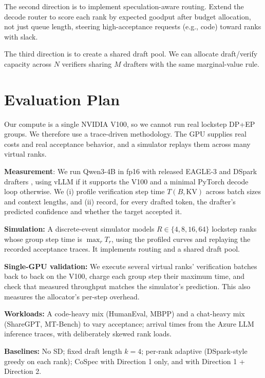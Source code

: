 \documentclass{article}
\begin{document}
The second direction is to implement speculation-aware routing. Extend the decode router to score each
rank by expected goodput after budget allocation, not just queue length,
steering high-acceptance requests (e.g., code) toward ranks with slack.

The third direction is to create a shared draft pool. We can allocate draft/verify capacity
across $N$ verifiers sharing $M$ drafters with the same marginal-value rule.

\section{Evaluation Plan}
\label{sec:eval}

Our compute is a single NVIDIA V100, so we cannot run real lockstep DP+EP
groups. We therefore use a trace-driven methodology. The GPU supplies
real costs and real acceptance behavior, and a simulator replays them across
many virtual ranks.

\textbf{Measurement}: We run Qwen3-4B in fp16 with released
EAGLE-3 and DSpark drafters \cite{cheng2026dspark}, using vLLM if it supports
the V100 and a minimal PyTorch decode loop otherwise. We (i) profile verification
step time $T(B,\mathrm{KV})$ across batch sizes and context lengths, and
(ii) record, for every drafted token, the drafter's predicted confidence and
whether the target accepted it.

\textbf{Simulation:} A discrete-event simulator models $R\in\{4,8,16,64\}$
lockstep ranks whose group step time is $\max_r T_r$, using the profiled curves
and replaying the recorded acceptance traces. It implements routing and a
shared draft pool.

\textbf{Single-GPU validation:} We execute several virtual ranks' verification
batches back to back on the V100, charge each group step their maximum time,
and check that measured throughput matches the simulator's prediction. This
also measures the allocator's per-step overhead.

\textbf{Workloads:} A code-heavy mix (HumanEval, MBPP) and a chat-heavy mix
(ShareGPT, MT-Bench) to vary acceptance; arrival times from the Azure LLM
inference traces, with deliberately skewed rank loads.

\textbf{Baselines:} No SD; fixed draft length $k=4$; per-rank adaptive
(DSpark-style greedy on each rank); CoSpec with Direction 1 only, and with Direction 1 + Direction 2.
\end{document}
